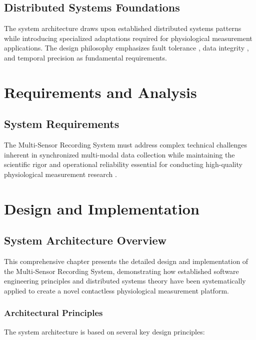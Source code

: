\documentclass[11pt,a4paper]{report}
\begin{document}
\section{Distributed Systems Foundations}

The system architecture draws upon established distributed systems patterns \cite{Buschmann1996} while introducing
specialized adaptations required for physiological measurement applications. The design philosophy emphasizes fault tolerance \cite{Gray1993}, data
integrity \cite{Date2003}, and temporal precision \cite{Mills1991} as fundamental requirements.

\chapter{Requirements and Analysis}

\section{System Requirements}

The Multi-Sensor Recording System must address complex technical challenges inherent in synchronized multi-modal data collection while
maintaining the scientific rigor and operational reliability essential for conducting high-quality physiological
measurement research \cite{Healey2005, Boucsein2012}.

\chapter{Design and Implementation}

\section{System Architecture Overview}

This comprehensive chapter presents the detailed design and implementation of the Multi-Sensor Recording System,
demonstrating how established software engineering principles \cite{Martin2008, Fowler2018} and distributed systems
theory \cite{Tanenbaum2016, Coulouris2011} have been systematically applied to create a novel contactless physiological
measurement platform.

\subsection{Architectural Principles}

The system architecture is based on several key design principles:
\end{document}
